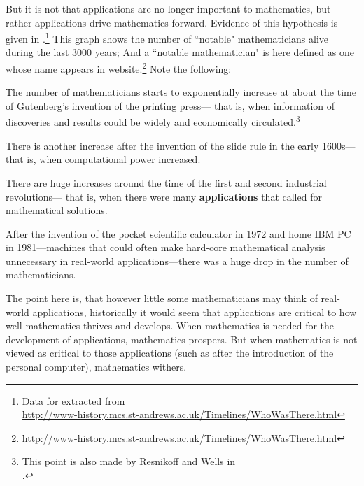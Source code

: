 But it is not that applications are no longer important to mathematics,
but rather applications drive mathematics forward.
Evidence of this hypothesis is given in
.\footnote{Data for  extracted from \\
  \url{http://www-history.mcs.st-andrews.ac.uk/Timelines/WhoWasThere.html}}
This graph shows the number of ``notable" mathematicians alive during the last 3000 years;
And a ``notable mathematician" is here defined as one whose name appears
in  
website.\footnote{\url{http://www-history.mcs.st-andrews.ac.uk/Timelines/WhoWasThere.html}}
Note the following:
\begin{liste}

\item The number of mathematicians starts to exponentially increase at
about the time of Gutenberg's invention of the printing press---
that is, when information of discoveries and results could be widely and economically
circulated.\footnote{This point is also made by Resnikoff and Wells in\\
.}

\item There is another increase after the invention of the slide rule in the early 1600s---
that is, when computational power increased.

\item There are huge increases around the time of the first and second industrial revolutions---
that is, when there were many {\bf applications} that called for mathematical solutions.

\item After the invention of the pocket scientific calculator in 1972
and home IBM PC in 1981---machines that could
often make hard-core mathematical analysis unnecessary in real-world applications---there
was a huge drop in the number of mathematicians.

\end{liste}

The point here is, that however little some mathematicians may think of
real-world applications,
historically it would seem that applications are critical to
how well mathematics thrives and develops.
When mathematics is needed for the development of applications,
mathematics prospers.
But when mathematics is not viewed as critical to those applications
(such as after the introduction of the personal computer),
mathematics withers.


